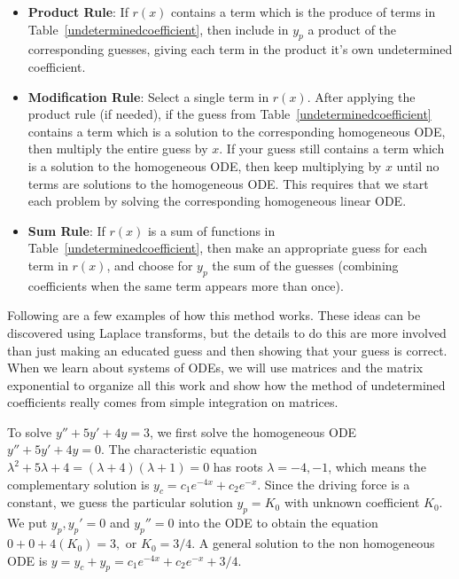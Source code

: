 \begin{itemize}

\item \textbf{Product Rule}: If $r(x)$ contains a term which is the produce of terms in Table~\ref{undeterminedcoefficient}, then include in $y_p$ a product of the corresponding guesses, giving each term in the product it's own undetermined coefficient.
\item \textbf{Modification Rule}: Select a single term in $r(x)$. After applying the product rule (if needed), if the guess from Table~\ref{undeterminedcoefficient} contains a term which is a solution to the corresponding homogeneous ODE, then multiply the entire guess by $x$. If your guess still contains a term which is a solution to the homogeneous ODE, then keep multiplying by $x$ until no terms are solutions to the homogeneous ODE. This requires that we start each problem by solving the corresponding homogeneous linear ODE. 
\item \textbf{Sum Rule}: If $r(x)$ is a sum of functions in Table~\ref{undeterminedcoefficient}, then make an appropriate guess for each term in $r(x)$, and choose for $y_p$ the sum of the guesses (combining coefficients when the same term appears more than once).
\end{itemize}
Following are a few examples of how this method works. These ideas can be discovered using Laplace transforms, but the details to do this are more involved than just making an educated guess and then showing that your guess is correct. When we learn about systems of ODEs, we will use matrices and the matrix exponential to organize all this work and show how the method of undetermined coefficients really comes from simple integration on matrices.

\begin{example}
To solve $y''+5y'+4y=3$, we first solve the homogeneous ODE $y''+5y'+4y=0$. The characteristic equation $\lambda^2+5\lambda+4=(\lambda+4)(\lambda+1)=0$ has roots $\lambda=-4,-1$, which means the complementary solution is $y_c = c_1e^{-4x}+c_2e^{-x}$. Since the driving force is a constant, we guess the particular solution $y_p=K_0$ with unknown coefficient $K_0$.  We put $y_p, y_p' = 0$ and $y_p'' = 0$ into the ODE to obtain the equation $0+0+4(K_0)=3,$ or $K_0=3/4$. A general solution to the non homogeneous ODE is $y=y_c+y_p = c_1e^{-4x}+c_2e^{-x} + 3/4$.
\end{example}

